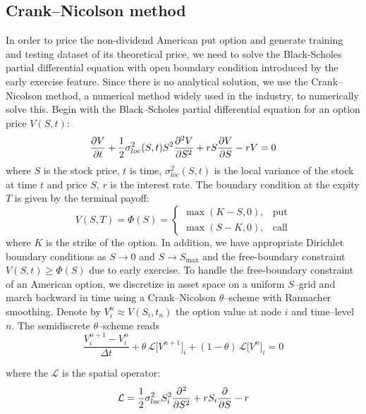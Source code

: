 \documentclass[%
 reprint,
 superscriptaddress,
nobibnotes,
 amsmath,amssymb,
 aps,
]{revtex4-2}
\begin{document}
\subsection{Crank–Nicolson method}
\label{ssec:Crank–Nicolson}
% 
In order to price the non-dividend American put option and generate training and testing dataset of its theoretical price, we need to solve the Black-Scholes \cite{black1973pricing} partial differential equation with open boundary condition introduced by the early exercise feature. Since there is no analytical solution, we use the Crank–Nicolson\cite{crank1947practical} method, a numerical method widely used in the industry, to numerically solve this. Begin with the Black–Scholes partial differential equation for an option price $V(S,t)$:
\begin{equation}
\pdv{V}{t} + \frac{1}{2}\sigma^2_{loc}(S,t) S^2\pdv[2]{V}{S} + rS\pdv{V}{S} - rV = 0
\end{equation}
where $S$ is the stock price, $t$ is time, $\sigma^2_{loc}(S,t)$ is the local variance \cite{jeanblanc2009mathematical, derman1996local} of the stock at time $t$ and price $S$, $r$ is the interest rate. The boundary condition at the expity $T$ is given by the terminal payoff: 
\begin{equation}
V(S,T)=\Phi(S)=
\begin{cases}
\max(K-S,0),&\text{put}\\
\max(S-K,0),&\text{call}  
\end{cases}
\end{equation}
where $K$ is the strike of the option. In addition, we have appropriate Dirichlet boundary conditions as $S\to0$ and $S\to S_{\max}$ and the free-boundary constraint $V(S,t)\geq\Phi(S)$ due to early exercise. To handle the free-boundary constraint of an American option, we discretize in asset space on a uniform $S$–grid and march backward in time using a Crank–Nicolson \cite{crank1947practical} $\theta$–scheme with Rannacher smoothing. Denote by $V_i^n\approx V(S_i,t_n)$ the option value at node $i$ and time–level $n$.  The semidiscrete $\theta$–scheme reads
\begin{equation}
\frac{V_i^{n+1}-V_i^n}{\Delta t}
+\theta\,\mathcal L\bigl[V^{n+1}\bigr]_i
+(1-\theta)\,\mathcal L\bigl[V^n\bigr]_i
=0    
\end{equation}

where the $\mathcal{L}$ is the spatial operator:
\begin{equation}
\mathcal{L} = \frac{1}{2}\sigma^2_{loc} S_i^2\pdv[2]{S} + rS_i\pdv{S} - r
\end{equation}
\end{document}
